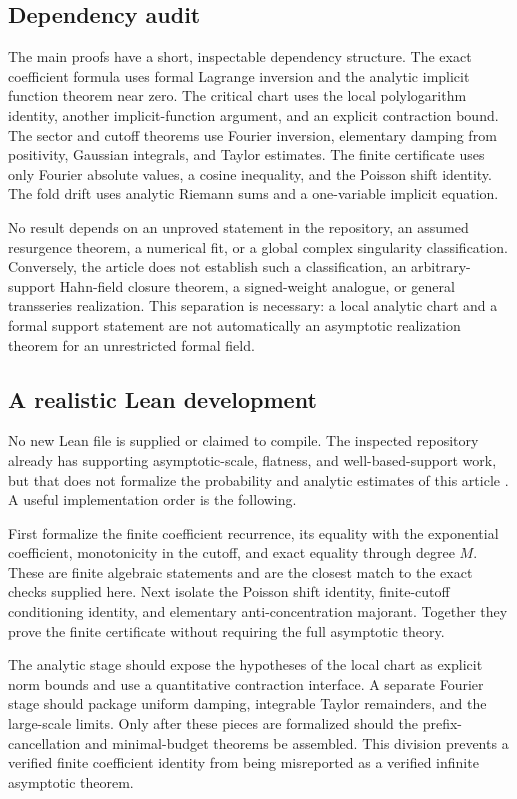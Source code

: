 \documentclass[11pt,a4paper]{article}
\numberwithin{equation}{section}
\theoremstyle{definition}
\theoremstyle{remark}
\begin{document}
\subsection{Dependency audit}
The main proofs have a short, inspectable dependency structure. The exact
coefficient formula uses formal Lagrange inversion and the analytic implicit
function theorem near zero. The critical chart uses the local polylogarithm
identity, another implicit-function argument, and an explicit contraction
bound. The sector and cutoff theorems use Fourier inversion, elementary
damping from positivity, Gaussian integrals, and Taylor estimates. The
finite certificate uses only Fourier absolute values, a cosine inequality,
and the Poisson shift identity. The fold drift uses analytic Riemann sums
and a one-variable implicit equation.

No result depends on an unproved statement in the repository, an assumed
resurgence theorem, a numerical fit, or a global complex singularity
classification. Conversely, the article does not establish such a
classification, an arbitrary-support Hahn-field closure theorem, a signed-weight
analogue, or general transseries realization. This separation is necessary:
a local analytic chart and a formal support statement are not automatically
an asymptotic realization theorem for an unrestricted formal field.

\subsection{A realistic Lean development}
No new Lean file is supplied or claimed to compile. The inspected repository
already has supporting asymptotic-scale, flatness, and well-based-support
work, but that does not formalize the probability and analytic estimates of
this article \cite{repo-index}. A useful implementation order is the following.

First formalize the finite coefficient recurrence, its equality with the
exponential coefficient, monotonicity in the cutoff, and exact equality
through degree \(M\). These are finite algebraic statements and are the
closest match to the exact checks supplied here. Next isolate the Poisson
shift identity, finite-cutoff conditioning identity, and elementary
anti-concentration majorant. Together they prove the finite certificate
without requiring the full asymptotic theory.

The analytic stage should expose the hypotheses of the local chart as
explicit norm bounds and use a quantitative contraction interface. A
separate Fourier stage should package uniform damping, integrable Taylor
remainders, and the large-scale limits. Only after these pieces are formalized
should the prefix-cancellation and minimal-budget theorems be assembled.
This division prevents a verified finite coefficient identity from being
misreported as a verified infinite asymptotic theorem.
\end{document}
